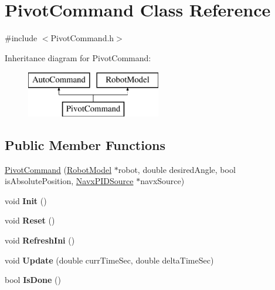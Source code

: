 \hypertarget{class_pivot_command}{}\section{Pivot\+Command Class Reference}
\label{class_pivot_command}


{\ttfamily \#include $<$Pivot\+Command.\+h$>$}

Inheritance diagram for Pivot\+Command\+:\begin{figure}[H]
\begin{center}
\leavevmode
\includegraphics[height=2.000000cm]{class_pivot_command}
\end{center}
\end{figure}
\subsection*{Public Member Functions}
\begin{DoxyCompactItemize}
\item 
\hyperlink{class_pivot_command_aeed6d5f91fade3124c4a66080edad50d}{Pivot\+Command} (\hyperlink{class_robot_model}{Robot\+Model} $\ast$robot, double desired\+Angle, bool is\+Absolute\+Position, \hyperlink{class_navx_p_i_d_source}{Navx\+P\+I\+D\+Source} $\ast$navx\+Source)
\item 
\mbox{\label{class_pivot_command_a4bc3497678e5fdc84e0ec545f87fcd2a}} 
void {\bfseries Init} ()
\item 
\mbox{\label{class_pivot_command_a728a96471b607920a8e3581b15c2a6ed}} 
void {\bfseries Reset} ()
\item 
\mbox{\label{class_pivot_command_aabcc35cb7b9a7401285f800475d79bb1}} 
void {\bfseries Refresh\+Ini} ()
\item 
\mbox{\label{class_pivot_command_ab43066cd70a708f342f53f94558acf98}} 
void {\bfseries Update} (double curr\+Time\+Sec, double delta\+Time\+Sec)
\item 
\mbox{\label{class_pivot_command_acc8ed3e6a76a19a05201131f0bd7ccc5}} 
bool {\bfseries Is\+Done} ()
\end{DoxyCompactItemize}
